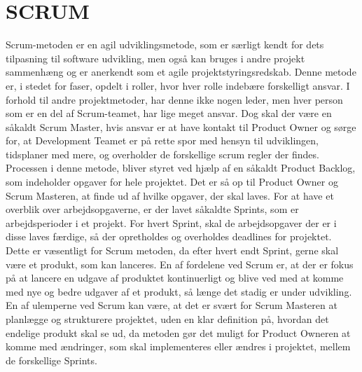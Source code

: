 \section{SCRUM}
Scrum-metoden er en agil udviklingsmetode, som er særligt kendt for dets tilpasning til software udvikling, men også kan bruges i andre projekt sammenhæng og er anerkendt som et agile projektstyringsredskab. Denne metode er, i stedet for faser, opdelt i roller, hvor hver rolle indebære forskelligt ansvar.\cite{HTL} I forhold til andre projektmetoder, har denne ikke nogen leder, men hver person som er en del af Scrum-teamet, har lige meget ansvar. Dog skal der være en såkaldt Scrum Master, hvis ansvar er at have kontakt til Product Owner og sørge for, at Development Teamet er på rette spor med hensyn til udviklingen, tidsplaner med mere, og overholder de forskellige scrum regler der findes. Processen i denne metode, bliver styret ved hjælp af en såkaldt Product Backlog, som indeholder opgaver for hele projektet. Det er så op til Product Owner og Scrum Masteren, at finde ud af hvilke opgaver, der skal laves. For at have et overblik over arbejdsopgaverne, er der lavet såkaldte Sprints, som er arbejdsperioder i et projekt. For hvert Sprint, skal de arbejdsopgaver der er i disse laves færdige, så der opretholdes og overholdes deadlines for projektet. Dette er væsentligt for Scrum metoden, da efter hvert endt Sprint, gerne skal være et produkt, som kan lanceres. En af fordelene ved Scrum er, at der er fokus på at lancere en udgave af produktet kontinuerligt og blive ved med at komme med nye og bedre udgaver af et produkt, så længe det stadig er under udvikling. En af ulemperne ved Scrum kan være, at det er svært for Scrum Masteren at planlægge og strukturere projektet, uden en klar definition på, hvordan det endelige produkt skal se ud, da metoden gør det muligt for Product Owneren at komme med ændringer, som skal implementeres eller ændres i projektet, mellem de forskellige Sprints.\cite{HTL}

